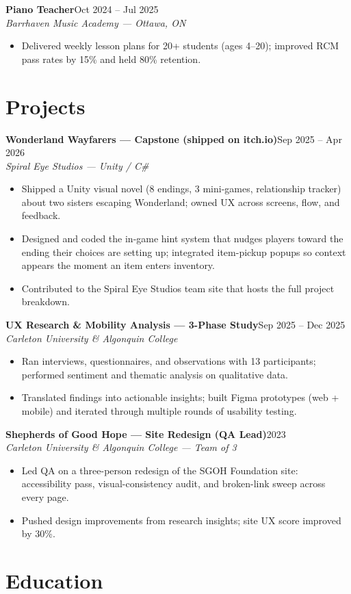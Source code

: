 \documentclass[letterpaper,11pt]{article}
\newcommand{\roleline}[2]{%
  \textbf{\large #1}\hfill{\small #2}\\[-2pt]
}
\newcommand{\orgline}[1]{%
  {\small\textit{#1}}\\[-3pt]
}
\newcommand{\bulletsstart}{\begin{itemize}\footnotesize}
\newcommand{\bulletsend}{\end{itemize}}
\begin{document}
\roleline{Piano Teacher}{Oct 2024 -- Jul 2025}
\orgline{Barrhaven Music Academy --- Ottawa, ON}
\bulletsstart
  \item Delivered weekly lesson plans for 20+ students (ages 4--20); improved RCM pass rates by 15\% and held 80\% retention.
\bulletsend

\section{Projects}

\roleline{Wonderland Wayfarers --- Capstone (shipped on itch.io)}{Sep 2025 -- Apr 2026}
\orgline{Spiral Eye Studios --- Unity / C\#}
\bulletsstart
  \item Shipped a Unity visual novel (8 endings, 3 mini-games, relationship tracker) about two sisters escaping Wonderland; owned UX across screens, flow, and feedback.
  \item Designed and coded the in-game hint system that nudges players toward the ending their choices are setting up; integrated item-pickup popups so context appears the moment an item enters inventory.
  \item Contributed to the Spiral Eye Studios team site that hosts the full project breakdown.
\bulletsend

\roleline{UX Research \& Mobility Analysis --- 3-Phase Study}{Sep 2025 -- Dec 2025}
\orgline{Carleton University \& Algonquin College}
\bulletsstart
  \item Ran interviews, questionnaires, and observations with 13 participants; performed sentiment and thematic analysis on qualitative data.
  \item Translated findings into actionable insights; built Figma prototypes (web + mobile) and iterated through multiple rounds of usability testing.
\bulletsend

\roleline{Shepherds of Good Hope --- Site Redesign (QA Lead)}{2023}
\orgline{Carleton University \& Algonquin College --- Team of 3}
\bulletsstart
  \item Led QA on a three-person redesign of the SGOH Foundation site: accessibility pass, visual-consistency audit, and broken-link sweep across every page.
  \item Pushed design improvements from research insights; site UX score improved by 30\%.
\bulletsend

\section{Education}
\end{document}
